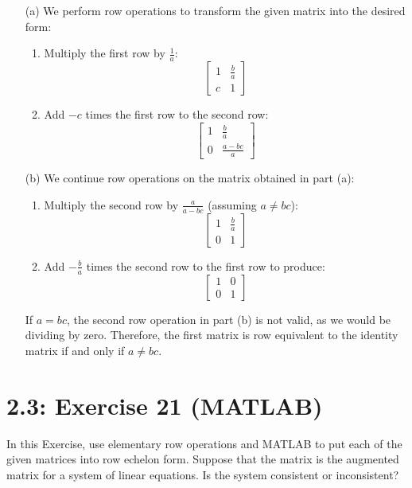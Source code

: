 \documentclass{report}
\begin{document}
\sol

\begin{enumerate}
\item[(a)] We perform row operations to transform the given matrix into the desired form:

\begin{enumerate}
\item Multiply the first row by $\frac{1}{a}$:
\[
\begin{bmatrix} 1 & \frac{b}{a} \\ c & 1 \end{bmatrix}
\]
\item Add $-c$ times the first row to the second row:
\[
\begin{bmatrix} 1 & \frac{b}{a} \\ 0 & \frac{a-bc}{a} \end{bmatrix}
\]
\end{enumerate}


\item[(b)] We continue row operations on the matrix obtained in part (a):

\begin{enumerate}
\item Multiply the second row by $\frac{a}{a-bc}$ (assuming $a \neq bc$):
\[
\begin{bmatrix} 1 & \frac{b}{a} \\ 0 & 1 \end{bmatrix}
\]
\item Add $-\frac{b}{a}$ times the second row to the first row to produce:
\[
\begin{bmatrix} 1 & 0 \\ 0 & 1 \end{bmatrix}
\]
\end{enumerate}


If $a = bc$, the second row operation in part (b) is not valid, as we would be dividing by zero. Therefore, the first matrix is row equivalent to the identity matrix if and only if $a \neq bc$.
\end{enumerate}

\section*{2.3: Exercise 21 (MATLAB)} 

In this Exercise, use elementary row
operations and MATLAB to put each of the given matrices into row echelon
form.  Suppose that the matrix is the augmented matrix for a system of
linear equations.  Is the system consistent or inconsistent?
\end{document}
